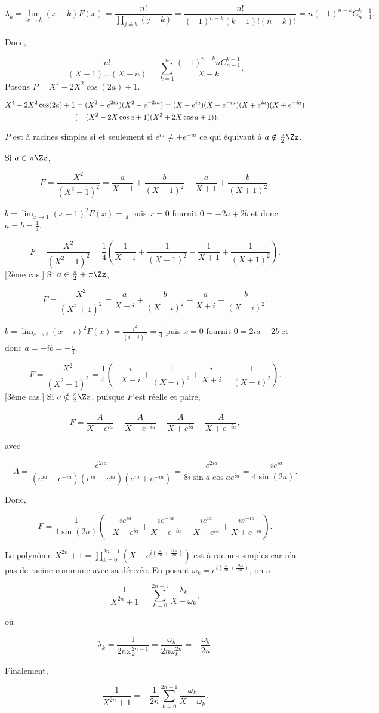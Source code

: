 {{$$\lambda_k=\lim_{x\rightarrow k}(x-k)F(x)=\frac{n!}{\prod_{j\neq k}^{}(j-k)}=\frac{n!}{(-1)^{n-k}(k-1)!(n-k)!}=n(-1)^{n-k}C_{n-1}^{k-1}.$$

Donc,

$$\frac{n!}{(X-1)...(X-n)}=\sum_{k=1}^{n}\frac{(-1)^{n-k}nC_{n-1}^{k-1}}{X-k}.$$
Posons $P=X^4-2X^2\cos(2a)+1$.

\begin{align*}\ensuremath
X^4-2X^2\cos(2a)+1&=(X^2-e^{2ia})(X^2-e^{-2ia})=(X-e^{ia})(X-e^{-ia})(X+e^{ia})(X+e^{-ia})\\
 &(=(X^2-2X\cos a+1)(X^2+2X\cos a+1)).
\end{align*}

$P$ est à racines simples si et seulement si $e^{ia}\neq\pm e^{-ia}$ ce qui équivaut à $a\notin\frac{\pi}{2}\Zz$.

\begin{itemize}
[1er cas.] Si $a\in\pi\Zz$,

$$F=\frac{X^2}{(X^2-1)^2}=\frac{a}{X-1}+\frac{b}{(X-1)^2}-\frac{a}{X+1}+\frac{b}{(X+1)^2}.$$

$b=\lim_{x\rightarrow 1}(x-1)^2F(x)=\frac{1}{4}$ puis $x=0$ fournit $0=-2a+2b$ et donc $a=b=\frac{1}{4}$.

$$F=\frac{X^2}{(X^2-1)^2}=\frac{1}{4}(\frac{1}{X-1}+\frac{1}{(X-1)^2}-\frac{1}{X+1}+\frac{1}{(X+1)^2}).$$
[2ème cas.] Si $a\in\frac{\pi}{2}+\pi\Zz$,

$$F=\frac{X^2}{(X^2+1)^2}=\frac{a}{X-i}+\frac{b}{(X-i)^2}-\frac{a}{X+i}+\frac{b}{(X+i)^2}.$$

$b=\lim_{x\rightarrow i}(x-i)^2F(x)=\frac{i^2}{(i+i)^2}=\frac{1}{4}$ puis $x=0$ fournit $0=2ia-2b$ et donc $a=-ib=-\frac{i}{4}$.

$$F=\frac{X^2}{(X^2+1)^2}=\frac{1}{4}(-\frac{i}{X-i}+\frac{1}{(X-i)^2}+\frac{i}{X+i}+\frac{1}{(X+i)^2}).$$
[3ème cas.] Si $a\notin\frac{\pi}{2}\Zz$, puisque $F$ est réelle et paire,

$$F=\frac{A}{X-e^{ia}}+\frac{\overline{A}}{X-e^{-ia}}-\frac{A}{X+e^{ia}}-\frac{\overline{A}}{X+e^{-ia}},$$

avec 

$$A=\frac{e^{2ia}}{(e^{ia}-e^{-ia})(e^{ia}+e^{ia})(e^{ia}+e^{-ia})}=\frac{e^{2ia}}{8i\sin a\cos ae^{ia}}=\frac{-ie^{ia}}{4\sin(2a)}.$$

Donc,

$$F=\frac{1}{4\sin(2a)}(-\frac{ie^{ia}}{X-e^{ia}}+\frac{ie^{-ia}}{X-e^{-ia}}+\frac{ie^{ia}}{X+e^{ia}}+\frac{ie^{-ia}}{X+e^{-ia}}).$$

\end{itemize}
Le polynôme $X^{2n}+1=\prod_{k=0}^{2n-1}(X-e^{i(\frac{\pi}{2n}+\frac{2k\pi}{2n})})$ est à racines simples car n'a pas de racine commune avec sa dérivée. En posant $\omega_k=e^{i(\frac{\pi}{2n}+\frac{2k\pi}{2n})}$, on a

$$\frac{1}{X^{2n}+1}=\sum_{k=0}^{2n-1}\frac{\lambda_k}{X-\omega_k},$$

où 

$$\lambda_k=\frac{1}{2n\omega_k^{2n-1}}=\frac{\omega_k}{2n\omega_k^{2n}}=-\frac{\omega_k}{2n}.$$

Finalement,

$$\frac{1}{X^{2n}+1}=-\frac{1}{2n}\sum_{k=0}^{2n-1}\frac{\omega_k}{X-\omega_k}.$$
}
}

